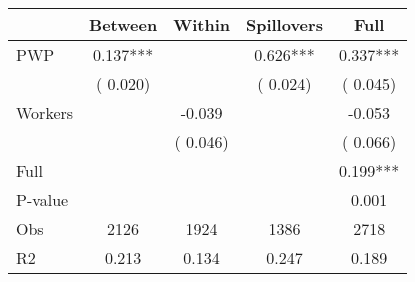 
\begin{tabular}{l*{4}{c}}\hline&\multicolumn{1}{c}{Between}&\multicolumn{1}{c}{Within}&\multicolumn{1}{c}{Spillovers}&\multicolumn{1}{c}{Full}\\ \hline
 PWP           &              0.137***      &                                               &        0.626*** &         0.337***                            \\ 
                               &        (       0.020)           &                                       &       (       0.024)     &      (       0.045)                                           \\ 
 Workers       &                                               &       -0.039    &                                &            -0.053                            \\ 
                               &                                               & (       0.046)                  &                                        &      (       0.066)                                           \\ 
\hline                                                                                                                                                                                                                                            
 Full                  &                                               &                                               &                                        &             0.199***                                     \\ 
 P-value               &                                               &                                               &                                        &             0.001                                           \\ 
 Obs                   &               2126               &       1924                       &       1386                &              2718                                               \\ 
 R2                    &                      0.213              &              0.134                      &              0.247               &                     0.189                                              \\ 
\hline \end{tabular}                                                                                                                                                                                                              